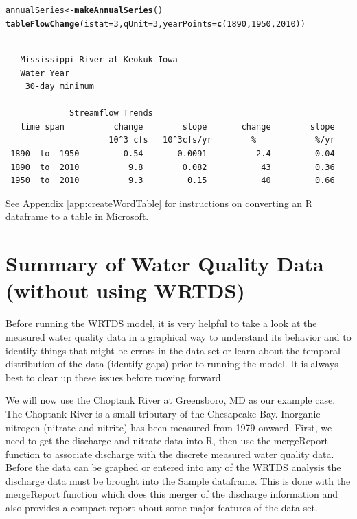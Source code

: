 \documentclass[a4paper,11pt]{article}\usepackage[]{graphicx}\usepackage[]{color}
\makeatletter
\newcommand{\hlnum}[1]{\textcolor[rgb]{0.686,0.059,0.569}{#1}}%
\newcommand{\hlstd}[1]{\textcolor[rgb]{0.345,0.345,0.345}{#1}}%
\newcommand{\hlkwb}[1]{\textcolor[rgb]{0.69,0.353,0.396}{#1}}%
\newcommand{\hlkwc}[1]{\textcolor[rgb]{0.333,0.667,0.333}{#1}}%
\newcommand{\hlkwd}[1]{\textcolor[rgb]{0.737,0.353,0.396}{\textbf{#1}}}%
\newenvironment{kframe}{%
 \def\at@end@of@kframe{}%
 \ifinner\ifhmode%
  \def\at@end@of@kframe{\end{minipage}}%
  \begin{minipage}{\columnwidth}%
 \fi\fi%
 \def\FrameCommand##1{\hskip\@totalleftmargin \hskip-\fboxsep
 \colorbox{shadecolor}{##1}\hskip-\fboxsep
     \hskip-\linewidth \hskip-\@totalleftmargin \hskip\columnwidth}%
 \MakeFramed {\advance\hsize-\width
   \@totalleftmargin\z@ \linewidth\hsize
   \@setminipage}}%
 {\par\unskip\endMakeFramed%
 \at@end@of@kframe}
\newenvironment{knitrout}{}{} %
\makeatother
\begin{document}
\begin{knitrout}
\color{fgcolor}\begin{kframe}
\begin{alltt}
\hlstd{annualSeries} \hlkwb{<-} \hlkwd{makeAnnualSeries}\hlstd{()}
\hlkwd{tableFlowChange}\hlstd{(}\hlkwc{istat}\hlstd{=}\hlnum{3}\hlstd{,} \hlkwc{qUnit}\hlstd{=}\hlnum{3}\hlstd{,}\hlkwc{yearPoints}\hlstd{=}\hlkwd{c}\hlstd{(}\hlnum{1890}\hlstd{,}\hlnum{1950}\hlstd{,}\hlnum{2010}\hlstd{))}
\end{alltt}
\begin{verbatim}

   Mississippi River at Keokuk Iowa
   Water Year
    30-day minimum 

             Streamflow Trends
   time span          change        slope       change        slope
                     10^3 cfs   10^3cfs/yr        %            %/yr
 1890  to  1950         0.54       0.0091          2.4         0.04
 1890  to  2010          9.8        0.082           43         0.36
 1950  to  2010          9.3         0.15           40         0.66
\end{verbatim}
\end{kframe}
\end{knitrout}


See Appendix \ref{app:createWordTable} for instructions on converting an R dataframe to a table in Microsoft. 

\FloatBarrier


\section{Summary of Water Quality Data (without using WRTDS)}
\label{sec:wqa}
\FloatBarrier

Before running the WRTDS model, it is very helpful to take a look at the measured water quality data in a graphical way to understand its behavior and to identify things that might be errors in the data set or learn about the temporal distribution of the data (identify gaps) prior to running the model.  It is always best to clear up these issues before moving forward.

We will now use the Choptank River at Greensboro, MD as our example case. The Choptank River is a small tributary of the Chesapeake Bay. Inorganic nitrogen (nitrate and nitrite) has been measured from 1979 onward. First, we need to get the discharge and nitrate data into R, then use the mergeReport function to associate discharge with the discrete measured water quality data. Before the data can be graphed or entered into any of the WRTDS analysis the discharge data must be brought into the Sample dataframe.  This is done with the mergeReport function which does this merger of the discharge information and also provides a compact report about some major features of the data set.
\end{document}
